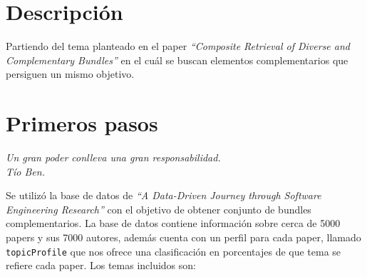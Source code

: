\section{Descripción}
{\begin{small}%
\begin{flushright}%
\it
\end{flushright}%
\end{small}%
\vspace{.5cm}}
Partiendo del tema planteado en el paper \textit{\textquotedblleft Composite Retrieval of Diverse 
and Complementary Bundles\textquotedblright} en el cuál se buscan elementos complementarios que 
persiguen un mismo objetivo.

\section{Primeros pasos}
{\begin{small}%
\begin{flushright}%
\it
Un gran poder conlleva una gran responsabilidad.\\
Tío Ben.
\end{flushright}%
\end{small}%
\vspace{.5cm}}
Se utilizó la base de datos de \textit{\textquotedblleft A Data-Driven Journey through Software 
Engineering Research\textquotedblright} con el objetivo de obtener conjunto de bundles 
complementarios. La base de datos contiene información sobre cerca de 5000 papers y sus 7000 
autores, además cuenta con un perfil para cada paper, llamado \texttt{topicProfile} que nos 
ofrece una clasificación en porcentajes de que tema se refiere cada paper. Los temas incluidos son:
